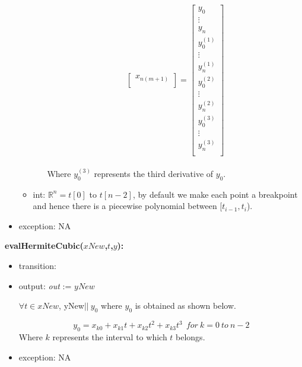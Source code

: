 \documentclass[12pt, titlepage]{article}
\begin{document}
\begin{itemize}
\begin{itemize}
\begin{enumerate}
\begin{equation*}
\begin{bmatrix}
		x_{n(m+1)} \\
		\end{bmatrix} = 
		\begin{bmatrix}
		y_0  \\
		\vdots \\
		y_n  \\
		y_0 ^{(1)} \\
		\vdots \\
		y_n ^{(1)} \\
		y_0 ^{(2)} \\
		\vdots \\
		y_n ^{(2)} \\  
		y_0 ^{(3)} \\
		\vdots \\
		y_n ^{(3)} \\ 
		\end{bmatrix}
		\end{equation*}\\ 
		Where $y_0 ^{(3)}$ represents the third derivative of $y_0$.
	\end{enumerate}
	\item int: $\mathbb{R}^{n} = t[0] $ to $t[n-2]$, by default we 
	make each point a breakpoint and hence there is a piecewise polynomial 
	between [$t_{i-1},t_i$).
\end{itemize}	
	
\item exception: NA 
\end{itemize}



\noindent \textbf{evalHermiteCubic($xNew$,$t$,$y$):}
\begin{itemize}
	\item transition: 
		
	\item output:  \textit{out} := $yNew$
	
	$\forall t \in xNew$, yNew$\vert\vert\ y_0$ where $y_0$ is obtained as 
	shown 
	below.
	
	\begin{equation*}
	y_0 = x_{k0} + x_{k1} t + x_{k2} t^{2} + x_{k3} t^{3}\ \ for\ k = 0\ to\ n-2
	\end{equation*}
	Where $k$ represents the interval to which $t$ belongs.
	
	\item exception: NA
\end{itemize}



\end{document}
